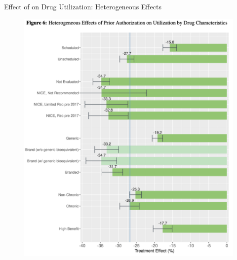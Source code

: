 \begin{frame}{Effect of on Drug Utilization: Heterogeneous Effects}
    \begin{figure}
        \centering
        \includegraphics[width=0.5\linewidth]{fig6.png}
       
    \end{figure}
\end{frame}